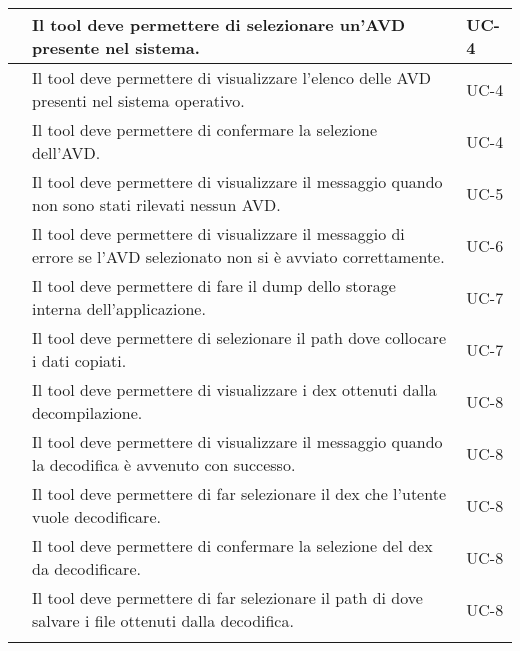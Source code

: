 \begin{longtable}{ | c| C{7cm} |C{3cm} |}
        & Il tool deve permettere di selezionare un'AVD presente nel sistema.                                                   & UC-4           \\\hline
        & Il tool deve permettere di visualizzare l'elenco delle AVD presenti nel sistema operativo.                            & UC-4           \\\hline
        & Il tool deve permettere di confermare la selezione dell'AVD.                                                          & UC-4           \\\hline
    \setcounter{subCount}{0}

           & Il tool deve permettere di visualizzare il messaggio quando non sono stati rilevati nessun AVD.                       & UC-5           \\\hline
           & Il tool deve permettere di visualizzare il messaggio di errore se l'AVD selezionato non si è avviato correttamente.   & UC-6           \\\hline
           & Il tool deve permettere di fare il dump dello storage interna dell'applicazione.                                      & UC-7           \\\hline
        & Il tool deve permettere di selezionare il path dove collocare i dati copiati.                                         & UC-7           \\\hline
    \setcounter{subCount}{0}

           & Il tool deve permettere di visualizzare i dex ottenuti dalla decompilazione.                                          & UC-8           \\\hline
        & Il tool deve permettere di visualizzare il messaggio quando la decodifica è avvenuto con successo.                    & UC-8           \\\hline
        & Il tool deve permettere di far selezionare il dex che l'utente vuole decodificare.                                    & UC-8           \\\hline
        & Il tool deve permettere di confermare la selezione del dex da decodificare.                                           & UC-8           \\\hline
        & Il tool deve permettere di far selezionare il path di dove salvare i file ottenuti dalla decodifica.                  & UC-8           \\\hline
    \setcounter{subCount}{0}


\end{longtable}
